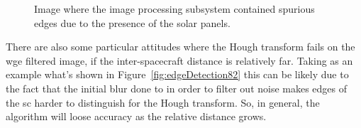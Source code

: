 \begin{figure}[htpb]
  \centering
  \qquad
  \qquad
  \qquad
  \caption{Image where the image processing subsystem contained spurious edges due to the presence of the solar panels.}
  \label{fig:edgeDetection204}
\end{figure}

There are also some particular attitudes where the Hough transform fails on the \acrshort{wge} filtered image, if the inter-spacecraft distance is relatively far. Taking as an example what's shown in Figure~\ref{fig:edgeDetection82} this can be likely due to the fact that the initial blur done to in order to filter out noise makes edges of the \acrshort{sc} harder to distinguish for the Hough transform. So, in general, the algorithm will loose accuracy as the relative distance grows.

